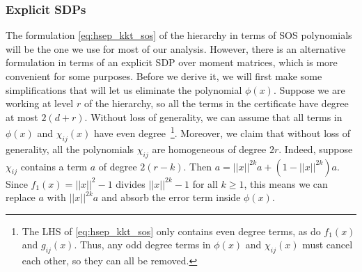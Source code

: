 \documentclass[aps,pra,notitlepage,preprintnumbers,11pt,tightenlines]{revtex4-1}
\begin{document}
\subsubsection{Explicit SDPs}
The formulation \eqref{eq:hsep_kkt_sos}  of the hierarchy in terms of
SOS polynomials will be the one we use for most of our analysis. However, there is an
alternative formulation in terms of an explicit SDP over moment matrices, which is more
convenient for some purposes. Before we derive it, we will first make
some simplifications that will let us eliminate the polynomial
$\phi(x)$. Suppose we are working at level $r$ of the hierarchy, so
all the terms in the certificate have degree at most $2(d+r)$. Without loss of generality, we can
assume that all terms in $\phi(x)$ and $\chi_{ij}(x)$ have even
degree~\footnote{The LHS of \eqref{eq:hsep_kkt_sos} only contains even
  degree terms, as do $f_1(x)$ and $g_{ij}(x)$. Thus, any odd degree
  terms in $\phi(x)$ and $\chi_{ij}(x)$ must cancel each other, so
  they can all be removed.}. Moreover, we claim that without loss of generality, all the
polynomials $\chi_{ij}$ are homogeneous of degree $2r$. Indeed,
suppose $\chi_{ij}$ contains a term $a$ of degree $2(r - k)$. Then $a
= ||x||^{2k} a + (1 - ||x||^{2k})a$. Since $f_1(x) = ||x||^2 - 1$
divides $||x||^{2k} - 1$ for all $k \geq 1$, this means we can replace
$a$ with $||x||^{2k} a$ and absorb the error term inside
$\phi(x)$.
\end{document}
